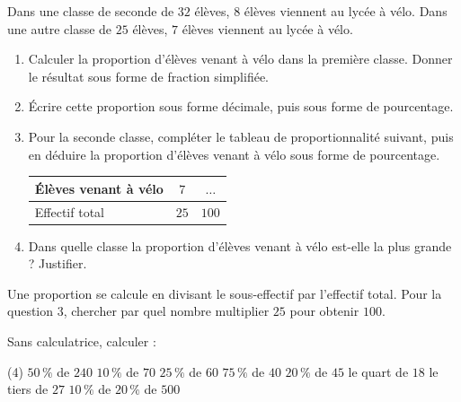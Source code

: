 \documentclass[10pt,a4paper]{article}
\begin{document}
\begin{exo}[Guidé]
Dans une classe de seconde de \(32\) élèves, \(8\) élèves viennent au lycée à vélo. Dans une autre classe de \(25\) élèves, \(7\) élèves viennent au lycée à vélo.
\begin{enumerate}[leftmargin=*]
    \item Calculer la proportion d'élèves venant à vélo dans la première classe. Donner le résultat sous forme de fraction simplifiée.
    \item Écrire cette proportion sous forme décimale, puis sous forme de pourcentage.
    \item \begin{minipage}[t]{\linewidth}
    Pour la seconde classe, compléter le tableau de proportionnalité suivant, puis en déduire la proportion d'élèves venant à vélo sous forme de pourcentage.

    \begin{center}
    \renewcommand{\arraystretch}{1.5}
    \begin{tabular}{|l|c|c|}
        \hline
        Élèves venant à vélo & \(7\) & \(\dots\) \\ \hline
        Effectif total & \(25\) & \(100\) \\ \hline
    \end{tabular}
    \end{center}
    \end{minipage}
    \item Dans quelle classe la proportion d'élèves venant à vélo est-elle la plus grande ? Justifier.
\end{enumerate}

\begin{bloc}
\begin{indication}
Une proportion se calcule en divisant le sous-effectif par l'effectif total. Pour la question 3, chercher par quel nombre multiplier \(25\) pour obtenir \(100\).
\end{indication}

\end{bloc}
\end{exo}

\begin{bloc}
\begin{exo}
Sans calculatrice, calculer :
\begin{tasks}(4)
    \task \(50\,\%\) de \(240\)
    \task \(10\,\%\) de \(70\)
    \task \(25\,\%\) de \(60\)
    \task \(75\,\%\) de \(40\)
    \task \(20\,\%\) de \(45\)
    \task le quart de \(18\)
    \task le tiers de \(27\)
    \task \(10\,\%\) de \(20\,\%\) de \(500\)
\end{tasks}
\end{exo}
\end{bloc}
\end{document}
